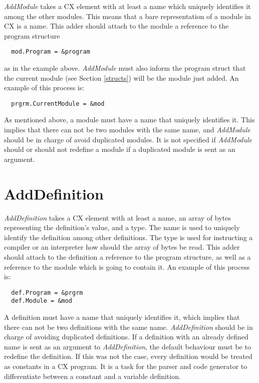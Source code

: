 \textit{AddModule} takes a CX element with at least a name which
uniquely identifies it among the other modules. This means that a bare
representation of a module in CX is a name. This adder should attach
to the module a reference to the program structure

\begin{lstlisting}
  mod.Program = &program
\end{lstlisting}

as in the example above. \textit{AddModule} must also inform the
program struct that the current module (see Section \ref{structs}) will be the module just
added. An example of this process is:

\begin{lstlisting}
  prgrm.CurrentModule = &mod
\end{lstlisting}

As mentioned above, a module must have a name that uniquely identifies
it. This implies that there can not be two modules with the same name,
and \textit{AddModule} should be in charge of avoid duplicated
modules. It is not specified if \textit{AddModule} should or should
not redefine a module if a duplicated module is sent as an argument.

\section{AddDefinition}
\label{adddefinition}

\textit{AddDefinition} takes a CX element with at least a name, an
array of bytes representing the definition's value, and a type. The
name is used to uniquely identify the definition among other
definitions. The type is used for instructing a compiler or an
interpreter how should the array of bytes be read. This adder should
attach to the definition a reference to the program structure, as well
as a reference to the module which is going to contain it. An example
of this process is:

\begin{lstlisting}
  def.Program = &prgrm
  def.Module = &mod
\end{lstlisting}

A definition must have a name that uniquely identifies it, which
implies that there can not be two definitions with the same
name. \textit{AddDefinition} should be in charge of avoiding
duplicated definitions. If a definition with an already defined name is sent as
an argument to \textit{AddDefinition}, the default behaviour must be to redefine
the definition. If this was not the case, every definition would be
treated as constants in a CX program. It is a task for the parser and
code generator to differentiate between a constant and a variable
definition.


